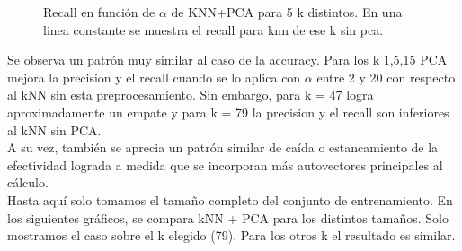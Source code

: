 \begin{figure}[H]
\caption{Recall en función de $\alpha$ de KNN+PCA para 5 k distintos. 
En una linea constante se muestra el recall para knn de ese k sin pca.}
\label{fig:exp5-recall-100}
\end{figure}

Se observa un patrón muy similar al caso de la accuracy. Para los k 1,5,15  PCA mejora la precision y el recall cuando se lo aplica con $\alpha$ entre 2 y 20 con respecto al kNN sin esta preprocesamiento.
Sin embargo, para k = 47 logra aproximadamente un empate y para k = 79 la precision y el recall son inferiores al kNN sin PCA. \\
A su vez, también se aprecia un patrón similar de caída o estancamiento de la efectividad lograda a medida que se incorporan más autovectores principales al cálculo. \\

Hasta aquí solo tomamos el tamaño completo del conjunto de entrenamiento. En los siguientes gráficos, se compara kNN + PCA para los distintos tamaños. Solo mostramos el caso sobre el k elegido (79). Para los otros k el resultado es similar. \\

